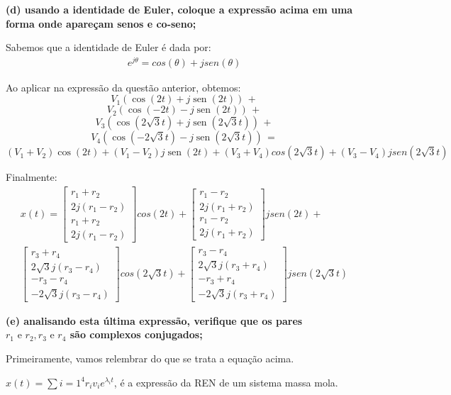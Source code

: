 \documentclass[11pt]{article}
\DeclareMathOperator{\sen}{sen}
\begin{document}
\textbf{(d) usando a identidade de Euler, coloque a expressão acima em uma forma onde apareçam senos e co-seno;}

Sabemos que a identidade de Euler é dada por:
\begin{align*}
  e^{j\theta} = cos(\theta) + jsen(\theta)
\end{align*}

Ao aplicar na expressão da questão anterior, obtemos:
\[V_1(\cos(2t)+j\sen(2t)) \, +\]
\[V_2(\cos(-2t)-j\sen(2t)) \, +\]
\[V_3(\cos(2\sqrt{3}t)+j\sen(2\sqrt{3}t)) \, +\]
\[V_4(\cos(-2\sqrt{3}t)-j\sen(2\sqrt{3}t)) \, =\]
\[(V_1+V_2)\cos(2t) + (V_1-V_2)j\sen(2t) + (V_3+V_4)cos(2\sqrt{3}t) + (V_3-V_4)jsen(2\sqrt{3}t)\]

Finalmente:
\begin{align*}
  x(t) =
  \begin{bmatrix}
    r_1+r_2\\
    2j(r_1-r_2)\\
    r_1+r_2\\
    2j(r_1-r_2)
  \end{bmatrix}
  cos(2t) +
    \begin{bmatrix}
      r_1-r_2\\
      2j(r_1+r_2)\\
      r_1-r_2\\
      2j(r_1+r_2)
    \end{bmatrix}
    jsen(2t) + \\
  \begin{bmatrix}
    r_3+r_4\\
    2\sqrt{3}j(r_3-r_4)\\
    -r_3-r_4\\
    -2\sqrt{3}j(r_3-r_4)
  \end{bmatrix}
  cos(2\sqrt{3}t) +
  \begin{bmatrix}
    r_3-r_4\\
    2\sqrt{3}j(r_3+r_4)\\
    -r_3+r_4\\
    -2\sqrt{3}j(r_3+r_4)
  \end{bmatrix}
  jsen(2\sqrt{3}t)
\end{align*}

\textbf{(e) analisando esta última expressão, verifique que os pares $r_1 \text{ e } r_2, r_3 \text{ e } r_4$ são complexos conjugados;}

Primeiramente, vamos relembrar do que se trata a equação acima.

$x(t) = \sum{i=1}^{4} r_i v_i e^{\lambda_i t}$, é a expressão da REN de um sistema massa mola.
\end{document}

